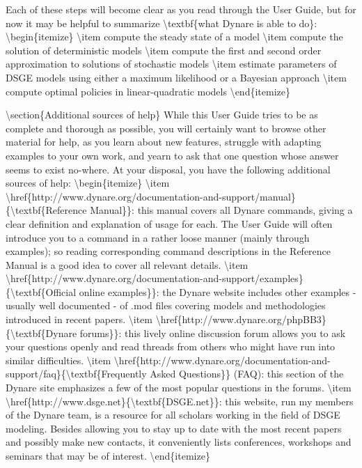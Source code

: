 \documentclass[10pt,math=newtx,citestyle=gb7714-2015,bibstyle=gb7714-2015]{elegantbook}
\begin{document}
	Each of these steps will become clear as you read through the User Guide, but for now it may be helpful to summarize \textbackslash{}textbf\{what Dynare is able to do\}:
	\textbackslash{}begin\{itemize\}
	\textbackslash{}item compute the steady state of a model
	\textbackslash{}item compute the solution of deterministic models
	\textbackslash{}item compute the first and second order approximation to solutions of stochastic models
	\textbackslash{}item estimate parameters of DSGE models using either a maximum likelihood or a Bayesian approach
	\textbackslash{}item compute optimal policies in linear-quadratic models
	\textbackslash{}end\{itemize\}
	
	
	\textbackslash{}section\{Additional sources of help\}
	While this User Guide tries to be as complete and thorough as possible, you will certainly want to browse other material for help, as you learn about new features, struggle with adapting examples to your own work, and yearn to ask that one question whose answer seems to exist no-where. At your disposal, you have the following additional sources of help:
	\textbackslash{}begin\{itemize\}
	\textbackslash{}item \textbackslash{}href\{http://www.dynare.org/documentation-and-support/manual\}\{\textbackslash{}textbf\{Reference Manual\}\}: this manual covers all Dynare commands, giving a clear definition and explanation of usage for each. The User Guide will often introduce you to a command in a rather loose manner (mainly through examples); so reading corresponding command descriptions in the Reference Manual is a good idea to cover all relevant details.
	\textbackslash{}item \textbackslash{}href\{http://www.dynare.org/documentation-and-support/examples\}\{\textbackslash{}textbf\{Official online examples\}\}: the Dynare website includes other examples - usually well documented - of .mod files covering models and methodologies introduced in recent papers.
	\textbackslash{}item \textbackslash{}href\{http://www.dynare.org/phpBB3\}\{\textbackslash{}textbf\{Dynare forums\}\}: this lively online discussion forum allows you to ask your questions openly and read threads from others who might have run into similar difficulties.
	\textbackslash{}item \textbackslash{}href\{http://www.dynare.org/documentation-and-support/faq\}\{\textbackslash{}textbf\{Frequently Asked Questions\}\} (FAQ): this section of the Dynare site emphasizes a few of the most popular questions in the forums.
	\textbackslash{}item \textbackslash{}href\{http://www.dsge.net\}\{\textbackslash{}textbf\{DSGE.net\}\}: this website, run my members of the Dynare team, is a resource for all scholars working in the field of DSGE modeling. Besides allowing you to stay up to date with the most recent papers and possibly make new contacts, it conveniently lists conferences, workshops and seminars that may be of interest.
	\textbackslash{}end\{itemize\}
	
\end{document}
